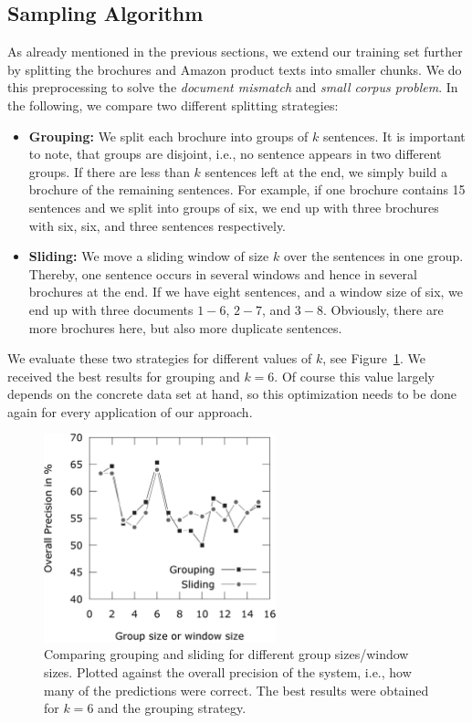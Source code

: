 \subsection{Sampling Algorithm}
As already mentioned in the previous sections, we extend our training set further by splitting the brochures and Amazon product texts into smaller chunks.
We do this preprocessing to solve the \emph{document mismatch} and \emph{small corpus problem}.
In the following, we compare two different splitting strategies:
\begin{itemize}
	\item
		\textbf{Grouping:}
		We split each brochure into groups of $k$ sentences.
		It is important to note, that groups are disjoint, i.e., no sentence appears in two different groups.
		If there are less than $k$ sentences left at the end, we simply build a brochure of the remaining sentences.
		For example, if one brochure contains 15 sentences and we split into groups of six, we end up with three brochures with six, six, and three sentences respectively.
	\item
		\textbf{Sliding:}
		We move a sliding window of size $k$ over the sentences in one group.
		Thereby, one sentence occurs in several windows and hence in several brochures at the end.
		If we have eight sentences, and a window size of six, we end up with three documents $1 - 6$, $2 - 7$, and $3 - 8$.
		Obviously, there are more brochures here, but also more duplicate sentences.
\end{itemize}

We evaluate these two strategies for different values of $k$, see Figure~\ref{fig:sampling_optimization}.
We received the best results for grouping and $k = 6$.
Of course this value largely depends on the concrete data set at hand, so this optimization needs to be done again for every application of our \nto approach.

\begin{figure}
	\begin{center}
		\includegraphics[width=0.6\textwidth]{figures/sampling_optimization.eps}
	\end{center}
	\caption{Comparing grouping and sliding for different group sizes/window sizes. Plotted against the overall precision of the system, i.e., how many of the predictions were correct. The best results were obtained for $k = 6$ and the grouping strategy.}
	\label{fig:sampling_optimization}
\end{figure}
